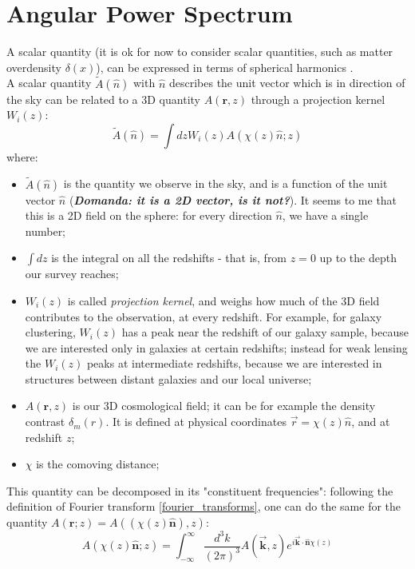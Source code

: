 \section{Angular Power Spectrum}
A scalar quantity (it is ok for now to consider scalar quantities, such as matter overdensity $\delta(x)$), can be expressed in terms of spherical harmonics \cite{Chiarenza_et_al_2024}. \\
A scalar quantity $\tilde{A}(\hat{n})$ with $\hat{n}$ describes the unit vector which is in direction of the sky can be related to a 3D quantity $A(\textbf{r},z)$ through a projection kernel $W_i(z)$:
\begin{equation}
    \tilde{A}(\hat{n}) = \int dz W_i(z) A(\chi(z) \hat{n}; z)
\label{eq1_blast}
\end{equation}
where:
\begin{itemize}
    \item $\tilde{A}(\hat{n})$ is the quantity we observe in the sky, and is a function of the unit vector $\hat{n}$ (\textbf{\textit{Domanda: it is a 2D vector, is it not?}}). It seems to me that this is a 2D field on the sphere: for every direction $\hat{n}$, we have a single number; 
    \item $\int dz $ is the integral on all the redshifts - that is, from $z = 0$ up to the depth our survey reaches; 
    \item $W_i(z)$ is called \textit{projection kernel}, and weighs how much of the 3D field contributes to the observation, at every redshift. For example, for galaxy clustering, $W_i(z)$ has a peak near the redshift of our galaxy sample, because we are interested only in galaxies at certain redshifts; instead for weak lensing the $W_i(z)$ peaks at intermediate redshifts, because we are interested in structures between distant galaxies and our local universe;
    \item $A(\textbf{r},z)$ is our 3D cosmological field; it can be for example the density contrast $\delta_m(r)$. It is defined at physical coordinates $\vec{r} = \chi(z)\hat{n}$, and at redshift $z$;
    \item $\chi$ is the comoving distance;
\end{itemize}
This quantity can be decomposed in its "constituent frequencies": following the definition of Fourier transform \ref{fourier_transforms}, one can do the same for the quantity $A({\textbf{r}}; z) = A((\chi(z)\hat{\textbf{n}}),z)$:
\begin{equation}
    A(\chi(z) \hat{\textbf{n}}; z) = \int_{-\infty}^{\infty} \frac{d^3k}{(2\pi)^3} A(\vec{\textbf{k}}, z) e^{i\vec{\textbf{k}}\cdot\hat{\textbf{n}}\chi(z)} 
\label{eq2_blast}
\end{equation}
